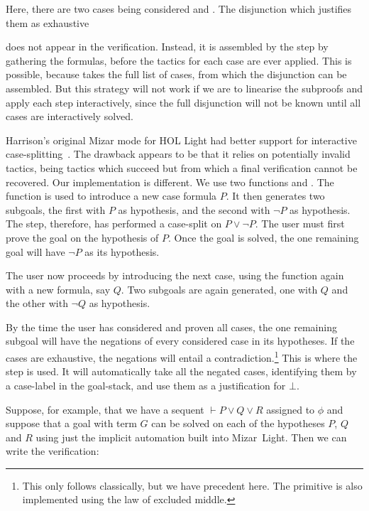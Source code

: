 {\samepage Here, there are two cases being considered  and . The disjunction which justifies them as exhaustive
\begin{center}\end{center}}

\noindent does not appear in the verification. Instead, it is assembled by the  step by gathering the  formulas, before the tactics for each case are ever applied. This is possible, because  takes the full list of cases, from which the disjunction can be assembled. But this strategy will not work if we are to linearise the subproofs and apply each step interactively, since the full disjunction will not be known until all cases are interactively solved.

Harrison's original Mizar mode for HOL Light had better support for interactive case-splitting~\cite{MizarHOL}. The drawback appears to be that it relies on potentially invalid tactics, being tactics which succeed but from which a final verification cannot be recovered. Our implementation is different. We use two functions  and . The  function is used to introduce a new case formula $P$. It then generates two subgoals, the first with $P$ as hypothesis, and the second with $\neg P$ as hypothesis. The  step, therefore, has performed a case-split on $P\vee\neg P$. The user must first prove the goal on the hypothesis of $P$. Once the goal is solved, the one remaining goal will have $\neg P$ as its hypothesis.

The user now proceeds by introducing the next case, using the  function again with a new formula, say $Q$. Two subgoals are again generated, one with $Q$ and the other with $\neg Q$ as hypothesis.

By the time the user has considered and proven all cases, the one remaining subgoal will have the negations of every considered case in its hypotheses. If the cases are exhaustive, the negations will entail a contradiction.\footnote{This only follows classically, but we have precedent here. The  primitive is also implemented using the law of excluded middle.} This is where the  step is used. It will automatically take all the negated cases, identifying them by a case-label  in the goal-stack, and use them as a justification for $\bot$.

Suppose, for example, that we have a sequent $\vdash P \vee Q \vee R$ assigned to $\phi$ and suppose that a goal with term $G$ can be solved on each of the hypotheses $P$, $Q$ and $R$ using just the implicit automation built into Mizar~Light. Then we can write the verification:

